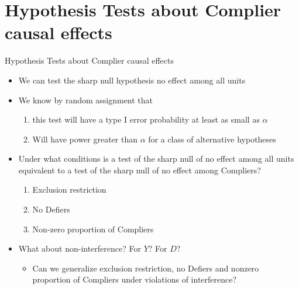 \documentclass[table, xcolor={dvipsnames}, 9pt]{beamer}
\theoremstyle{newstyle}
\begin{document}
\section{Hypothesis Tests about Complier causal effects}
\begin{frame}{{Hypothesis Tests about Complier causal effects}}
\begin{itemize}
\item We can test the sharp null hypothesis no effect among all units
\item \pause We know by random assignment that
\begin{enumerate}
\item \pause this test will have a type I error probability at least as small as $\alpha$
\item \pause Will have power greater than $\alpha$ for a class of alternative hypotheses
\end{enumerate}
\item \pause Under what conditions is a test of the sharp null of no effect among all units equivalent to a test of the sharp null of no effect among Compliers?
\begin{enumerate}
\item \pause Exclusion restriction
\item \pause No Defiers
\item \pause Non-zero proportion of Compliers
\end{enumerate}	
\item \pause What about non-interference? For $Y$? For $D$?
\begin{itemize}
\item \pause Can we generalize exclusion restriction, no Defiers and nonzero proportion of Compliers under violations of interference?
\end{itemize}	
\end{itemize}	
\end{frame}
\end{document}
